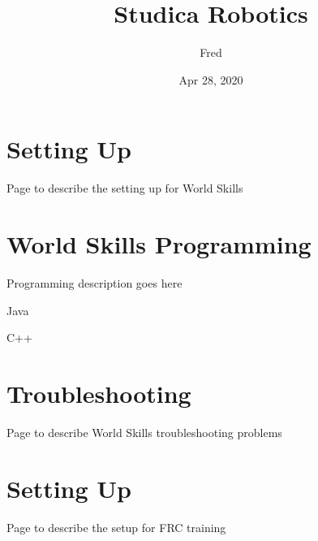\documentclass[letterpaper,10pt,english]{sphinxmanual}
\title{Studica Robotics}
\date{Apr 28, 2020}
\author{Fred}
\begin{document}
\pagestyle{empty}
\sphinxmaketitle
\pagestyle{plain}
\sphinxtableofcontents
\pagestyle{normal}
\label{\detokenize{index::doc}}



\chapter{Setting Up}
\label{\detokenize{docs/WorldSkills/setup:setting-up}}\label{\detokenize{docs/WorldSkills/setup::doc}}
Page to describe the setting up for World Skills


\chapter{World Skills Programming}
\label{\detokenize{docs/WorldSkills/programming:world-skills-programming}}\label{\detokenize{docs/WorldSkills/programming::doc}}
Programming description goes here

Java

C++

\begin{sphinxVerbatim}[commandchars=\\\{\}]
     
\end{sphinxVerbatim}

\begin{sphinxVerbatim}[commandchars=\\\{\}]
   
\end{sphinxVerbatim}


\chapter{Troubleshooting}
\label{\detokenize{docs/WorldSkills/troubleshooting:troubleshooting}}\label{\detokenize{docs/WorldSkills/troubleshooting::doc}}
Page to describe World Skills troubleshooting problems


\chapter{Setting Up}
\label{\detokenize{docs/FRCTraining/setup:setting-up}}\label{\detokenize{docs/FRCTraining/setup::doc}}
Page to describe the set\sphinxhyphen{}up for FRC training
\end{document}
